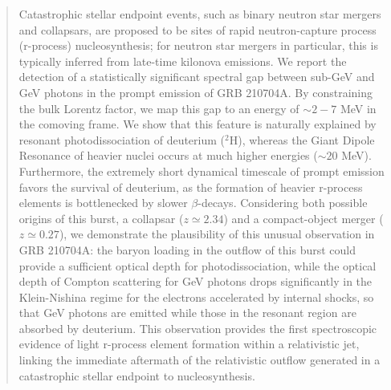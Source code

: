 \documentclass[linenumbers,twocolumn]{aastex631}
\begin{document}
\begin{abstract}

Catastrophic stellar endpoint events, such as binary neutron star mergers and collapsars, are proposed to be sites of rapid neutron-capture process (r-process) nucleosynthesis; for neutron star mergers in particular, this is typically inferred from late-time kilonova emissions. We report the detection of a statistically significant spectral gap between sub-GeV and GeV photons in the prompt emission of GRB 210704A. By constraining the bulk Lorentz factor, we map this gap to an energy of $\sim 2-7$ MeV in the comoving frame. We show that this feature is naturally explained by resonant photodissociation of deuterium ($^2$H), whereas the Giant Dipole Resonance of heavier nuclei occurs at much higher energies ($\sim 20$ MeV). Furthermore, the extremely short dynamical timescale of prompt emission favors the survival of deuterium, as the formation of heavier r-process elements is bottlenecked by slower $\beta$-decays. Considering both possible origins of this burst, a collapsar ($z\simeq2.34$) and a compact-object merger ($z\simeq0.27$), we demonstrate the plausibility of this unusual observation in GRB 210704A: the baryon loading in the outflow of this burst could provide a sufficient optical depth for photodissociation, while the optical depth of Compton scattering for GeV photons drops significantly in the Klein-Nishina regime for the electrons accelerated by internal shocks, so that GeV photons are emitted while those in the resonant region are absorbed by deuterium. This observation provides the first spectroscopic evidence of light r-process element formation within a relativistic jet, linking the immediate aftermath of the relativistic outflow generated in a catastrophic stellar endpoint to nucleosynthesis.


\end{abstract}
\end{document}
